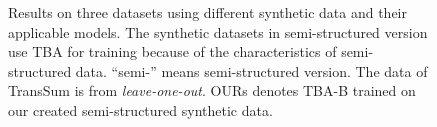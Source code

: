 \begin{figure}[ht]
	\caption{Results on three datasets using different synthetic data and their applicable models. The synthetic datasets in semi-structured version
		use TBA for training because of the characteristics of semi-structured data. ``semi-'' means semi-structured version. The data of TransSum is from {\em leave-one-out}. OURs denotes TBA-B trained on our created semi-structured synthetic data.}
	\label{fig:abl_data}
\end{figure}

